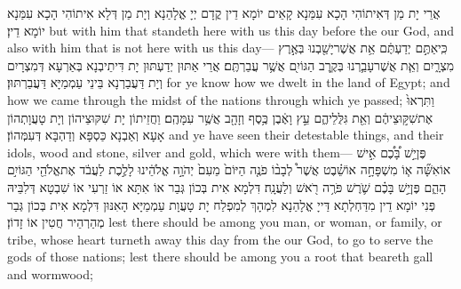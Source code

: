{אֲרֵי יָת מַן דְּאִיתוֹהִי הָכָא עִמַּנָא קָאֵים יוֹמָא דֵין קֳדָם יְיָ אֱלָהַנָא וְיָת מַן דְּלָא אִיתוֹהִי הָכָא עִמַּנָא יוֹמָא דֵין׃}
{but with him that standeth here with us this day before the \lord\space our God, and also with him that is not here with us this day—}{}
{כִּֽי\maqqaf אַתֶּ֣ם יְדַעְתֶּ֔ם אֵ֥ת אֲשֶׁר\maqqaf יָשַׁ֖בְנוּ בְּאֶ֣רֶץ מִצְרָ֑יִם וְאֵ֧ת אֲשֶׁר\maqqaf עָבַ֛רְנוּ בְּקֶ֥רֶב הַגּוֹיִ֖ם אֲשֶׁ֥ר עֲבַרְתֶּֽם׃}
{אֲרֵי אַתּוּן יְדַעְתּוּן יָת דִּיתֵיבְנָא בְּאַרְעָא דְּמִצְרָיִם וְיָת דַּעֲבַרְנָא בֵּינֵי עַמְמַיָּא דַּעֲבַרְתּוּן׃}
{for ye know how we dwelt in the land of Egypt; and how we came through the midst of the nations through which ye passed;}{}
{וַתִּרְאוּ֙ אֶת\maqqaf שִׁקּ֣וּצֵיהֶ֔ם וְאֵ֖ת גִּלֻּלֵיהֶ֑ם עֵ֣ץ וָאֶ֔בֶן כֶּ֥סֶף וְזָהָ֖ב אֲשֶׁ֥ר עִמָּהֶֽם׃}
{וַחֲזֵיתוֹן יָת שִׁקּוּצֵיהוֹן וְיָת טָעֲוָתְהוֹן אָעָא וְאַבְנָא כַּסְפָּא וְדַהְבָּא דְּעִמְּהוֹן׃}
{and ye have seen their detestable things, and their idols, wood and stone, silver and gold, which were with them—}{}
{פֶּן\maqqaf יֵ֣שׁ בָּ֠כֶ֠ם אִ֣ישׁ אוֹ\maqqaf אִשָּׁ֞ה א֧וֹ מִשְׁפָּחָ֣ה אוֹ\maqqaf שֵׁ֗בֶט אֲשֶׁר֩ לְבָב֨וֹ פֹנֶ֤ה הַיּוֹם֙ מֵעִם֙ יְהֹוָ֣ה אֱלֹהֵ֔ינוּ לָלֶ֣כֶת לַעֲבֹ֔ד אֶת\maqqaf אֱלֹהֵ֖י הַגּוֹיִ֣ם הָהֵ֑ם פֶּן\maqqaf יֵ֣שׁ בָּכֶ֗ם שֹׁ֛רֶשׁ פֹּרֶ֥ה רֹ֖אשׁ וְלַעֲנָֽה׃}
{דִּלְמָא אִית בְּכוֹן גְּבַר אוֹ אִתָּא אוֹ זַרְעִי אוֹ שִׁבְטָא דְּלִבֵּיהּ פְּנִי יוֹמָא דֵין מִדַּחְלְתָא דַּייָ אֱלָהַנָא לִמְהָךְ לְמִפְלַח יָת טָעֲוָת עַמְמַיָּא הָאִנּוּן דִּלְמָא אִית בְּכוֹן גְּבַר מְהַרְהֵיר חֲטִין אוֹ זָדוֹן׃}
{lest there should be among you man, or woman, or family, or tribe, whose heart turneth away this day from the \lord\space our God, to go to serve the gods of those nations; lest there should be among you a root that beareth gall and wormwood;}{}
